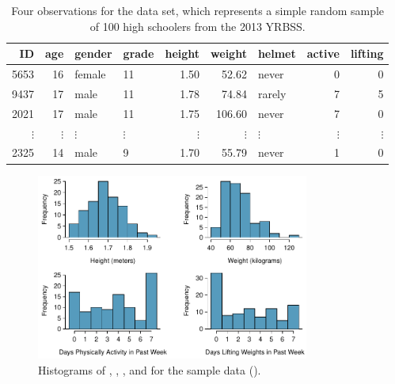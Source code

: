 \begin{spacing}{1.5}
\begin{table}
	\centering
	\begin{tabular}{rrllrrlrr}
		\hline
		ID & age & gender & grade & height & weight & helmet & active & lifting \\ 
		\hline
		5653 &  16 & female & 11 & 1.50 & 52.62 & never &   0 &   0 \\ 
		9437 &  17 & male & 11 & 1.78 & 74.84 & rarely &   7 &   5 \\ 
		2021 &  17 & male & 11 & 1.75 & 106.60 & never &   7 &   0 \\ 
		$\vdots$ & $\vdots$ & $\vdots$ & $\vdots$ & $\vdots$ & $\vdots$ & $\vdots$ & $\vdots$ & $\vdots$ \\
		2325 &  14 & male & 9 & 1.70 & 55.79 & never &   1 &   0 \\ 
		\hline
	\end{tabular}
	\caption{Four observations for the  data set, which represents a simple random sample of 100 high schoolers from the 2013 YRBSS.}
	\label{yrbssSampDF}
\end{table}

\begin{figure}
\centering
\includegraphics[width=0.8\textwidth]
{ch_inference_foundations_oi_biostat/figures/yrbssSampHistograms/yrbssSampHistograms} 
\caption{Histograms of , , , and  for the sample data ().}
\label{yrbssSampHistograms}
\end{figure}


\end{spacing}
